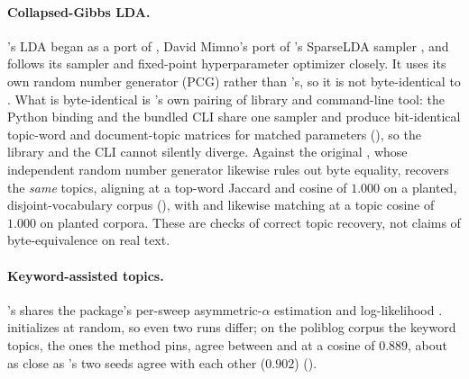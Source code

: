 \documentclass[article]{jss}
\begin{document}
\paragraph{Collapsed-Gibbs LDA.} 's LDA began as a port of
, David Mimno's  port of 's SparseLDA
sampler \citep{yao2009sparselda}, and follows its sampler and fixed-point
hyperparameter optimizer closely. It uses its own random number generator (PCG)
rather than 's, so it is not byte-identical to .
What is byte-identical is 's own pairing of library and command-line
tool: the Python binding and the bundled  CLI share one sampler and
produce bit-identical topic-word and document-topic matrices for matched
parameters (), so the library and the CLI cannot
silently diverge. Against the original  , whose
independent random number generator likewise rules out byte equality, 
recovers the \emph{same} topics, aligning at a top-word Jaccard and cosine of
$1.000$ on a planted, disjoint-vocabulary corpus (),
with  and  likewise matching  at a topic
cosine of $1.000$ on planted corpora. These are checks of correct topic recovery,
not claims of byte-equivalence on real text.

\paragraph{Keyword-assisted topics.} 's  shares the
  package's per-sweep asymmetric-$\alpha$ estimation and
 log-likelihood \citep{eshima2024keyatm}. 
initializes at random, so even two  runs differ; on the poliblog
corpus the keyword topics, the ones the method pins, agree between 
and  at a cosine of $0.889$, about as close as 's two seeds
agree with each other ($0.902$) ().
\end{document}
